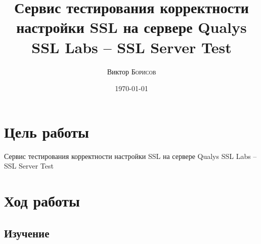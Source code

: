 \documentclass[10pt,a4paper]{article}
\title{Сервис тестирования корректности настройки SSL на сервере Qualys SSL Labs – SSL Server Test} %
\author{Виктор \textsc{Борисов}} %
\date{\today} %
\begin{document}
\maketitle %

\newpage

\tableofcontents

\newpage


\section{Цель работы}

Сервис тестирования корректности настройки SSL на сервере Qualys SSL Labs – SSL Server Test

\section{Ход работы}

\subsection{Изучение}
\end{document}
